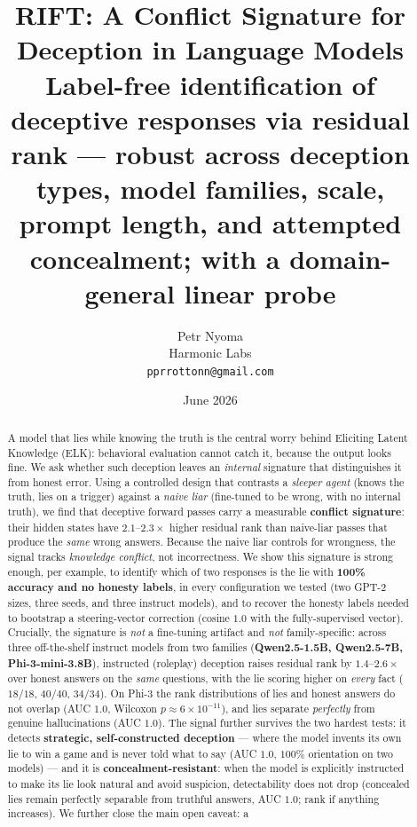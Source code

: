 \documentclass[11pt]{article}
\title{\textbf{RIFT: A Conflict Signature for Deception in Language Models}\\
\large Label-free identification of deceptive responses via residual rank ---
robust across deception types, model families, scale, prompt length, and
attempted concealment; with a domain-general linear probe}
\author{Petr Nyoma\\ Harmonic Labs\\ \texttt{pprrottonn@gmail.com}}
\date{June 2026}
\begin{document}
\maketitle

\begin{abstract}
A model that lies while knowing the truth is the central worry behind Eliciting
Latent Knowledge (ELK): behavioral evaluation cannot catch it, because the
output looks fine. We ask whether such deception leaves an \emph{internal}
signature that distinguishes it from honest error. Using a controlled design
that contrasts a \emph{sleeper agent} (knows the truth, lies on a trigger)
against a \emph{naive liar} (fine-tuned to be wrong, with no internal truth), we
find that deceptive forward passes carry a measurable \textbf{conflict
signature}: their hidden states have $2.1$--$2.3\times$ higher residual rank
than naive-liar passes that produce the \emph{same} wrong answers. Because the
naive liar controls for wrongness, the signal tracks \emph{knowledge conflict},
not incorrectness. We show this signature is strong enough, per example, to
identify which of two responses is the lie with \textbf{100\% accuracy and no
honesty labels}, in every configuration we tested (two GPT-2 sizes, three seeds,
and three instruct models), and to recover the honesty labels needed to bootstrap
a steering-vector correction (cosine $1.0$ with the fully-supervised vector). Crucially, the signature is \emph{not}
a fine-tuning artifact and \emph{not} family-specific: across three off-the-shelf
instruct models from two families (\textbf{Qwen2.5-1.5B, Qwen2.5-7B,
Phi-3-mini-3.8B}), instructed (roleplay) deception raises residual rank by
$1.4$--$2.6\times$ over honest answers on the \emph{same} questions, with the lie
scoring higher on \emph{every} fact ($18/18$, $40/40$, $34/34$). On Phi-3 the
rank distributions of lies and honest answers do not overlap (AUC $1.0$, Wilcoxon
$p\!\approx\!6\!\times\!10^{-11}$), and lies separate \emph{perfectly} from
genuine hallucinations (AUC $1.0$). The signal further survives the two hardest
tests: it detects \textbf{strategic, self-constructed deception} --- where the
model invents its own lie to win a game and is never told what to say (AUC $1.0$,
$100\%$ orientation on two models) --- and it is \textbf{concealment-resistant}:
when the model is explicitly instructed to make its lie look natural and avoid
suspicion, detectability does not drop (concealed lies remain perfectly separable
from truthful answers, AUC $1.0$; rank if anything increases). We further close the main open caveat: a

\end{abstract}
\end{document}
